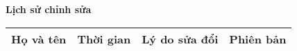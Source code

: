 \documentclass[./main.tex]{subfiles}
\begin{document}
\begin{center}
	\Large{\textbf{Lịch sử chỉnh sửa}}
	\begin{table}[H]
		\begin{tabular}{|p{}|p{}|p{}|p{}|}
			\hline
			\textbf{Họ và tên} & \textbf{Thời gian} & \textbf{Lý do sửa đổi} & \textbf{Phiên bản} \\ \hline
		\end{tabular}
	\end{table}
\end{center}
\end{document}

